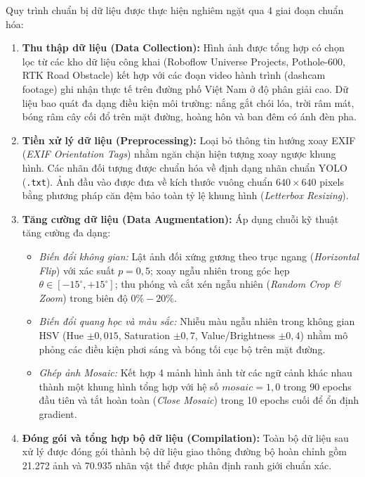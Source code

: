 Quy trình chuẩn bị dữ liệu được thực hiện nghiêm ngặt qua 4 giai đoạn chuẩn hóa:
\begin{enumerate}
    \item \textbf{Thu thập dữ liệu (Data Collection):} Hình ảnh được tổng hợp có chọn lọc từ các kho dữ liệu công khai (Roboflow Universe Projects, Pothole-600, RTK Road Obstacle) kết hợp với các đoạn video hành trình (dashcam footage) ghi nhận thực tế trên đường phố Việt Nam ở độ phân giải cao. Dữ liệu bao quát đa dạng điều kiện môi trường: nắng gắt chói lóa, trời râm mát, bóng râm cây cối đổ trên mặt đường, hoàng hôn và ban đêm có ánh đèn pha.
    \item \textbf{Tiền xử lý dữ liệu (Preprocessing):} Loại bỏ thông tin hướng xoay EXIF (\textit{EXIF Orientation Tags}) nhằm ngăn chặn hiện tượng xoay ngược khung hình. Các nhãn đối tượng được chuẩn hóa về định dạng nhãn chuẩn YOLO (\texttt{.txt}). Ảnh đầu vào được đưa về kích thước vuông chuẩn $640 \times 640$ pixels bằng phương pháp căn đệm bảo toàn tỷ lệ khung hình (\textit{Letterbox Resizing}).
    \item \textbf{Tăng cường dữ liệu (Data Augmentation):} Áp dụng chuỗi kỹ thuật tăng cường đa dạng:
    \begin{itemize}
        \item \textit{Biến đổi không gian:} Lật ảnh đối xứng gương theo trục ngang (\textit{Horizontal Flip}) với xác suất $p = 0,5$; xoay ngẫu nhiên trong góc hẹp $\theta \in [-15^\circ, +15^\circ]$; thu phóng và cắt xén ngẫu nhiên (\textit{Random Crop \& Zoom}) trong biên độ $0\% - 20\%$.
        \item \textit{Biến đổi quang học và màu sắc:} Nhiễu màu ngẫu nhiên trong không gian HSV (Hue $\pm 0,015$, Saturation $\pm 0,7$, Value/Brightness $\pm 0,4$) nhằm mô phỏng các điều kiện phơi sáng và bóng tối cục bộ trên mặt đường.
        \item \textit{Ghép ảnh Mosaic:} Kết hợp 4 mảnh hình ảnh từ các ngữ cảnh khác nhau thành một khung hình tổng hợp với hệ số $mosaic = 1,0$ trong 90 epochs đầu tiên và tắt hoàn toàn (\textit{Close Mosaic}) trong 10 epochs cuối để ổn định gradient.
    \end{itemize}
    \item \textbf{Đóng gói và tổng hợp bộ dữ liệu (Compilation):} Toàn bộ dữ liệu sau xử lý được đóng gói thành bộ dữ liệu giao thông đường bộ hoàn chỉnh gồm 21.272 ảnh và 70.935 nhãn vật thể được phân định ranh giới chuẩn xác.
\end{enumerate}

